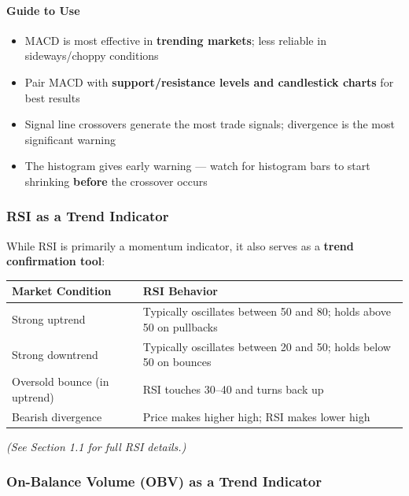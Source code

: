 \documentclass[12pt,openany]{book}
\begin{document}
\paragraph{Guide to Use}
\begin{itemize}[leftmargin=*]
    \item MACD is most effective in \textbf{trending markets}; less reliable in sideways/choppy conditions
    \item Pair MACD with \textbf{support/resistance levels and candlestick charts} for best results
    \item Signal line crossovers generate the most trade signals; divergence is the most significant warning
    \item The histogram gives early warning --- watch for histogram bars to start shrinking \textbf{before} the crossover occurs
\end{itemize}

\subsubsection{RSI as a Trend Indicator}

While RSI is primarily a momentum indicator, it also serves as a \textbf{trend confirmation tool}:

\begin{center}
\small
\renewcommand{\arraystretch}{1.2}
\begin{tabular}{|L{0.30\textwidth}|L{0.60\textwidth}|}
\hline
 \textbf{Market Condition} & \textbf{RSI Behavior} \\ \hline
 Strong uptrend & Typically oscillates between 50 and 80; holds above 50 on pullbacks \\ \hline
 Strong downtrend & Typically oscillates between 20 and 50; holds below 50 on bounces \\ \hline
 Oversold bounce (in uptrend) & RSI touches 30--40 and turns back up \\ \hline
 Bearish divergence & Price makes higher high; RSI makes lower high \\ \hline
\end{tabular}
\end{center}

\emph{(See Section 1.1 for full RSI details.)}

\subsubsection{On-Balance Volume (OBV) as a Trend Indicator}
\end{document}
